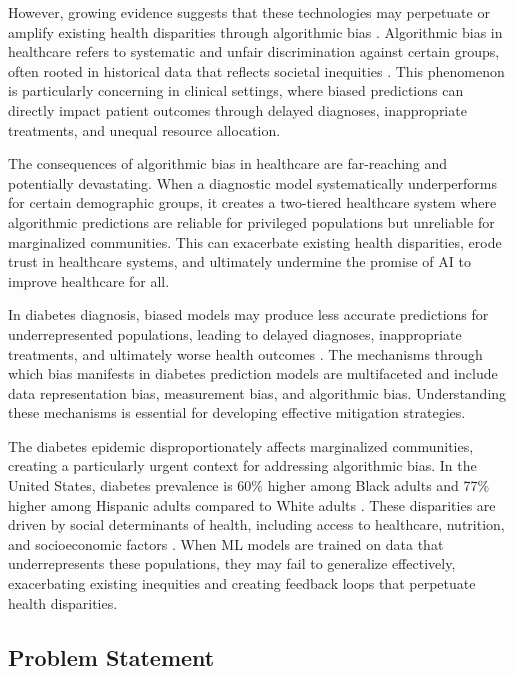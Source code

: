 However, growing evidence suggests that these technologies may perpetuate 
or amplify existing health disparities through algorithmic bias 
\cite{mehrabi2021}. Algorithmic bias in healthcare refers to systematic 
and unfair discrimination against certain groups, often rooted in historical 
data that reflects societal inequities \cite{barocas2019}. This phenomenon 
is particularly concerning in clinical settings, where biased predictions 
can directly impact patient outcomes through delayed diagnoses, inappropriate 
treatments, and unequal resource allocation.

The consequences of algorithmic bias in healthcare are far-reaching and 
potentially devastating. When a diagnostic model systematically underperforms 
for certain demographic groups, it creates a two-tiered healthcare system 
where algorithmic predictions are reliable for privileged populations but 
unreliable for marginalized communities. This can exacerbate existing health 
disparities, erode trust in healthcare systems, and ultimately undermine 
the promise of AI to improve healthcare for all.

In diabetes diagnosis, biased models may produce less accurate predictions 
for underrepresented populations, leading to delayed diagnoses, inappropriate 
treatments, and ultimately worse health outcomes \cite{obermeyer2019}. 
The mechanisms through which bias manifests in diabetes prediction models 
are multifaceted and include data representation bias, measurement bias, 
and algorithmic bias. Understanding these mechanisms is essential for 
developing effective mitigation strategies.

The diabetes epidemic disproportionately affects marginalized communities, 
creating a particularly urgent context for addressing algorithmic bias. 
In the United States, diabetes prevalence is 60\% higher among Black adults 
and 77\% higher among Hispanic adults compared to White adults \cite{cdc2020}. 
These disparities are driven by social determinants of health, including 
access to healthcare, nutrition, and socioeconomic factors \cite{hill2022}. 
When ML models are trained on data that underrepresents these populations, 
they may fail to generalize effectively, exacerbating existing inequities 
and creating feedback loops that perpetuate health disparities.

\subsection{Problem Statement}

